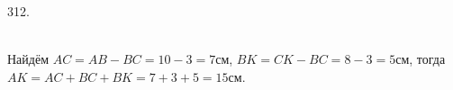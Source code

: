 312.\begin{figure}[ht!]
\end{figure}\\
Найдём $AC=AB-BC=10-3=7$см, $BK=CK-BC=8-3=5$см, тогда $AK=AC+BC+BK=7+3+5=15$см.\\

